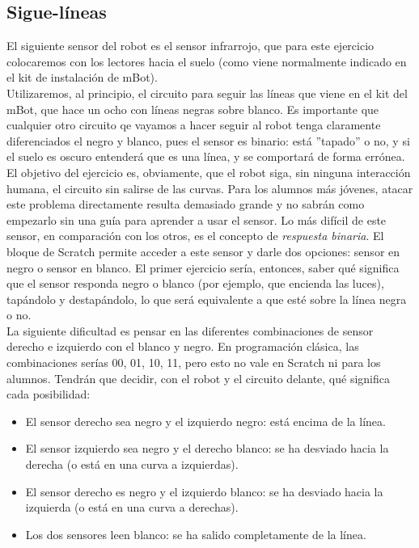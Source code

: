 \subsection{Sigue-líneas}
El siguiente sensor del robot es el sensor infrarrojo, que para este ejercicio colocaremos con los lectores hacia el suelo (como viene normalmente indicado en el kit de instalación de mBot).\\
Utilizaremos, al principio, el circuito para seguir las líneas que viene en el kit del mBot, que hace un ocho con líneas negras sobre blanco. Es importante que cualquier otro circuito qe vayamos a hacer seguir al robot tenga claramente diferenciados el negro y blanco, pues el sensor es binario: está ''tapado'' o no, y si el suelo es oscuro entenderá que es una línea, y se comportará de forma errónea.\\
El objetivo del ejercicio es, obviamente, que el robot siga, sin ninguna interacción humana, el circuito sin salirse de las curvas. Para los alumnos más jóvenes, atacar este problema directamente resulta demasiado grande y no sabrán como empezarlo sin una guía para aprender a usar el sensor. Lo más difícil de este sensor, en comparación con los otros, es el concepto de \textit{respuesta binaria}. El bloque de Scratch permite acceder a este sensor y darle dos opciones: sensor en negro o sensor en blanco. El primer ejercicio sería, entonces, saber qué significa que el sensor responda negro o blanco (por ejemplo, que encienda las luces), tapándolo y destapándolo, lo que será equivalente a que esté sobre la línea negra o no.\\
La siguiente dificultad es pensar en las diferentes combinaciones de sensor derecho e izquierdo con el blanco y negro. En programación clásica, las combinaciones serías 00, 01, 10, 11, pero esto no vale en Scratch ni para los alumnos. Tendrán que decidir, con el robot y el circuito delante, qué significa cada posibilidad:
\begin{itemize}
	\item El sensor derecho sea negro y el izquierdo negro: está encima de la línea.
	\item El sensor izquierdo sea negro y el derecho blanco: se ha desviado hacia la derecha (o está en una curva a izquierdas).
	\item El sensor derecho es negro y el izquierdo blanco: se ha desviado hacia la izquierda (o está en una curva a derechas).
	\item Los dos sensores leen blanco: se ha salido completamente de la línea.
\end{itemize}
